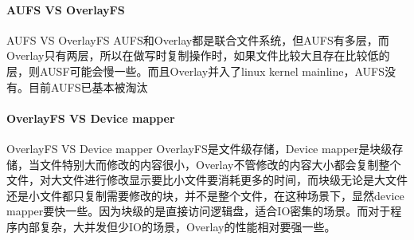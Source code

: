\documentclass[../../../interview-questions.tex]{subfiles}
\begin{document}
\paragraph{AUFS VS OverlayFS}

AUFS VS OverlayFS
AUFS和Overlay都是联合文件系统，但AUFS有多层，而Overlay只有两层，所以在做写时复制操作时，如果文件比较大且存在比较低的层，则AUSF可能会慢一些。而且Overlay并入了linux kernel mainline，AUFS没有。目前AUFS已基本被淘汰

\paragraph{OverlayFS VS Device mapper}

OverlayFS VS Device mapper
OverlayFS是文件级存储，Device mapper是块级存储，当文件特别大而修改的内容很小，Overlay不管修改的内容大小都会复制整个文件，对大文件进行修改显示要比小文件要消耗更多的时间，而块级无论是大文件还是小文件都只复制需要修改的块，并不是整个文件，在这种场景下，显然device mapper要快一些。因为块级的是直接访问逻辑盘，适合IO密集的场景。而对于程序内部复杂，大并发但少IO的场景，Overlay的性能相对要强一些。
\end{document}
